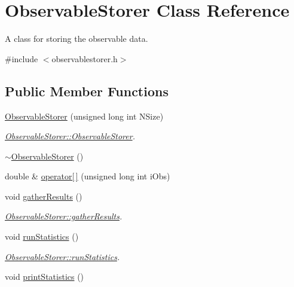 \hypertarget{class_observable_storer}{}\section{Observable\+Storer Class Reference}
\label{class_observable_storer}


A class for storing the observable data.  




{\ttfamily \#include $<$observablestorer.\+h$>$}

\subsection*{Public Member Functions}
\begin{DoxyCompactItemize}
\item 
\mbox{\hyperlink{class_observable_storer_a12833458c54a15e1abe299d628fc993c}{Observable\+Storer}} (unsigned long int N\+Size)
\begin{DoxyCompactList}\small\item\em \mbox{\hyperlink{class_observable_storer_a12833458c54a15e1abe299d628fc993c}{Observable\+Storer\+::\+Observable\+Storer}}. \end{DoxyCompactList}\item 
\mbox{\hyperlink{class_observable_storer_ac702a77bd6c6c0bff76d7b3959e8f658}{$\sim$\+Observable\+Storer}} ()
\item 
double \& \mbox{\hyperlink{class_observable_storer_a1eae8d9c9b4f9c60facc21a26b3bbb26}{operator\mbox{[}$\,$\mbox{]}}} (unsigned long int i\+Obs)
\item 
void \mbox{\hyperlink{class_observable_storer_a593f13b0dd0f9d20608ef6b84fda3f1d}{gather\+Results}} ()
\begin{DoxyCompactList}\small\item\em \mbox{\hyperlink{class_observable_storer_a593f13b0dd0f9d20608ef6b84fda3f1d}{Observable\+Storer\+::gather\+Results}}. \end{DoxyCompactList}\item 
void \mbox{\hyperlink{class_observable_storer_a41b3756b423d31c6535d2981ef92d1a1}{run\+Statistics}} ()
\begin{DoxyCompactList}\small\item\em \mbox{\hyperlink{class_observable_storer_a41b3756b423d31c6535d2981ef92d1a1}{Observable\+Storer\+::run\+Statistics}}. \end{DoxyCompactList}\item 
void \mbox{\hyperlink{class_observable_storer_a04a12e7da9e21d6947027230c953bffe}{print\+Statistics}} ()

\end{DoxyCompactItemize}
